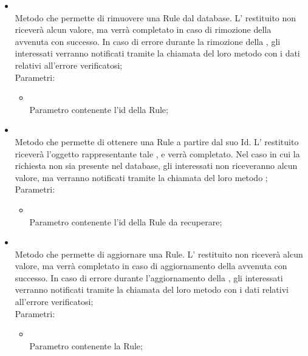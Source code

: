 \begin{itemize}
\begin{itemize}
		\item[]  \\
		Metodo che permette di rimuovere una Rule dal database. L' restituito non riceverà alcun valore, ma verrà completato in caso di rimozione della  avvenuta con successo. In caso di errore durante la rimozione della , gli  interessati verranno notificati tramite la chiamata del loro metodo  con i dati relativi all'errore verificatosi;\\
		Parametri:
		\begin{itemize}
			\item {} \\
			Parametro contenente l'id della Rule;
		\end{itemize}
		\item[]  \\
		Metodo che permette di ottenere una Rule a partire dal suo Id. L' restituito riceverà l'oggetto rappresentante tale , e verrà completato. Nel caso in cui la  richiesta non sia presente nel database, gli  interessati non riceveranno alcun valore, ma verranno notificati tramite la chiamata del loro metodo ;\\
		Parametri:
		\begin{itemize}
			\item {} \\
			Parametro contenente l'id della Rule da recuperare;
		\end{itemize}
		\item[]  \\
		Metodo che permette di aggiornare una Rule.  L' restituito non riceverà alcun valore, ma verrà completato in caso di aggiornamento della  avvenuta con successo. In caso di errore durante l'aggiornamento della , gli  interessati verranno notificati tramite la chiamata del loro metodo  con i dati relativi all'errore verificatosi;\\
		Parametri:
		\begin{itemize}
			\item {} \\
			Parametro contenente la Rule;
		\end{itemize}
	\end{itemize}
\end{itemize}
\FloatBarrier


